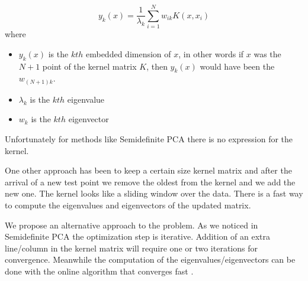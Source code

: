 \documentclass[12pt,letterpaper,doublespaced,ETD,dvips,proposal]{gtthesis}
\begin{document}
\begin{Body}
\begin{equation}
y_k(x) = \frac{1}{\lambda_k}\sum_{i=1}^{N} w_{ik}K(x, x_i)
\end{equation}
where
\begin{itemize}
  \item $y_k(x)$ is the $kth$ embedded dimension of $x$, in other
  words if $x$ was the $N+1$ point of the kernel matrix $K$, then
  $y_k(x)$ would have been the $w_{(N+1)k}$.
  \item $\lambda_k$ is the $kth$ eigenvalue
  \item $w_k$ is the $kth$ eigenvector
\end{itemize}
Unfortunately for methods like Semidefinite PCA there is no
expression for the kernel.

One other approach \cite{vanvaerenbergh2006swk} has been to keep a certain size kernel matrix and
after the arrival of a new test point we remove the oldest from the
kernel and we add the new one. The kernel looks like a sliding
window over the data. There is a fast way to compute the eigenvalues
and eigenvectors of the updated matrix.

We propose an alternative approach to the problem. As we noticed in
Semidefinite PCA the optimization step is iterative. Addition of an
extra line/column in the kernel matrix will require one or two
iterations for convergence. Meanwhile the computation of the
eigenvalues/eigenvectors can be done with the  online algorithm that
converges fast \cite{gorrell2006gha}.

\end{Body}

\begin{EndMatter}



\index %
\end{EndMatter}
\end{document}
